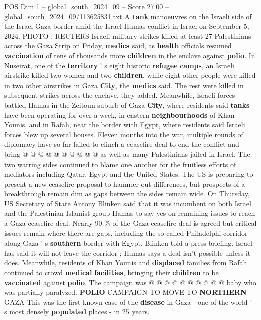 \begin{textsample}{POS Dim 1 – global\_south\_2024\_09 – Score 27.00 – global\_south\_2024\_09/113625831.txt}  \label{ex:f1_pos_210}
A \textbf{tank} manoeuvres on the Israeli side of the Israel-Gaza border amid the Israel-Hamas conflict in Israel on September 5, 2024.
PHOTO : REUTERS Israeli military strikes killed at least 27 Palestinians across the Gaza Strip on Friday, \textbf{medics} said, as \textbf{health} officials resumed \textbf{vaccination} of tens of thousands more \textbf{children} in the enclave against \textbf{polio}.
In Nuseirat, one of the \textbf{territory} ' s eight historic \textbf{refugee} \textbf{camps}, an Israeli airstrike killed two women and two \textbf{children}, while eight other people were killed in two other airstrikes in Gaza \textbf{City}, the \textbf{medics} said.
The rest were killed in subsequent strikes across the enclave, they added.
Meanwhile, Israeli forces battled Hamas in the Zeitoun suburb of Gaza \textbf{City}, where residents said \textbf{tanks} have been operating for over a week, in eastern \textbf{neighbourhoods} of Khan Younis, and in Rafah, near the border with Egypt, where residents said Israeli forces blew up several houses.
Eleven months into the war, multiple rounds of diplomacy have so far failed to clinch a ceasefire deal to end the conflict and bring @ @ @ @ @ @ @ @ @ @ as well as many Palestinians jailed in Israel.
The two warring sides continued to blame one another for the fruitless efforts of mediators including Qatar, Egypt and the United States.
The US is preparing to present a new ceasefire proposal to hammer out differences, but prospects of a breakthrough remain dim as gaps between the sides remain wide.
On Thursday, US Secretary of State Antony Blinken said that it was incumbent on both Israel and the Palestinian Islamist group Hamas to say yes on remaining issues to reach a Gaza ceasefire deal.
Nearly 90 \% of the Gaza ceasefire deal is agreed but critical issues remain where there are gaps, including the so-called Philadelphi corridor along Gaza ' s \textbf{southern} border with Egypt, Blinken told a press briefing.
Israel has said it will not leave the corridor ; Hamas says a deal isn't possible unless it does.
Meanwhile, residents of Khan Younis and \textbf{displaced} families from Rafah continued to crowd \textbf{medical} \textbf{facilities}, bringing their \textbf{children} to be \textbf{vaccinated} against \textbf{polio}.
The campaign was @ @ @ @ @ @ @ @ @ @ baby who was partially paralyzed. \textbf{POLIO} CAMPAIGN TO MOVE TO \textbf{NORTHERN} GAZA This was the first known case of the \textbf{disease} in Gaza - one of the world ' s most densely \textbf{populated} places - in 25 years.

\end{textsample}
